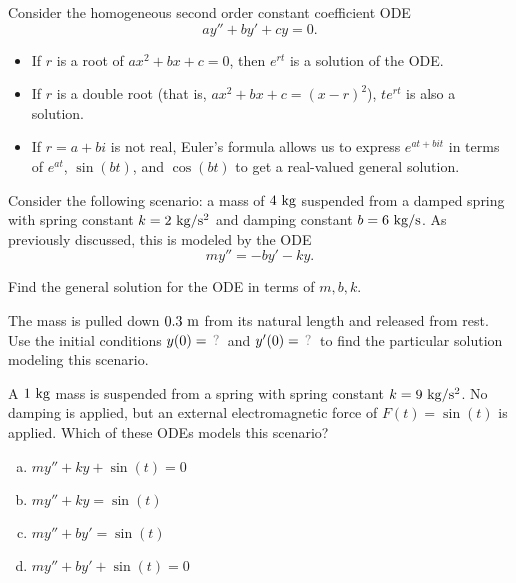 
\begin{applicationActivities}

\begin{observation}
Consider the homogeneous second order constant coefficient ODE \[ay''+by'+cy=0.\]
\vfill
\begin{itemize}
\item If \(r\) is a root of \(ax^2+bx+c=0\), then \(e^{rt}\) is a solution of the ODE.
\item If \(r\) is a double root (that is, \(ax^2+bx+c=(x-r)^2\)), \(te^{rt}\) is also a solution.
\item If \(r=a+bi\) is not real, Euler's formula allows us to express
  \(e^{at+bit}\) in terms of \(e^{at}\), \(\sin(bt)\), and \(\cos(bt)\) to get
  a real-valued general solution.
\end{itemize}
\end{observation}

\begin{activity}{15}
Consider the following scenario:  a mass of \(4\ {\rm kg}\) suspended from a 
damped spring with spring constant \(k=2\ {\rm kg/s^2}\) and 
damping constant \(b= 6\ {\rm kg/s}\). As previously discussed, this is modeled
by the ODE
\[my''=-by'-ky.\]
\begin{subactivity}
Find the general solution for the ODE in terms of \(m,b,k\).
\end{subactivity}
\begin{subactivity}
The mass is pulled down \(0.3\ {\rm m}\) from its natural length and released from rest.  
Use the initial conditions \(y(0)=\unknown\) and \(y'(0)=\unknown\) to 
find the particular solution modeling this scenario.
\end{subactivity}
\end{activity}

\begin{activity}{5}
A \(1\ {\rm kg}\) mass is suspended from a spring with spring constant \(k= 9\ {\rm kg/s^2}\).
No damping is applied, but an external electromagnetic force of \(F(t)=\sin(t)\)
is applied. Which of these ODEs models this scenario?
\begin{enumerate}[a)]
\item \(my''+ky+\sin(t)=0\)
\item \(my''+ky=\sin(t)\)
\item \(my''+by'=\sin(t)\)
\item \(my''+by'+\sin(t)=0\)
\end{enumerate}
\end{activity}


\end{applicationActivities}

